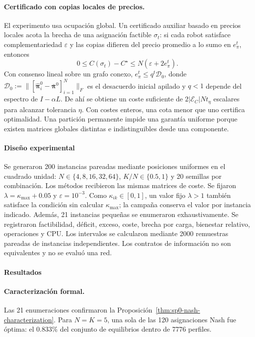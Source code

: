 \paragraph{Certificado con copias locales de precios.}
El experimento usa ocupación global. Un certificado auxiliar basado en precios locales acota la brecha de una asignación factible \(\sigma_t\): si cada robot satisface complementariedad \(\varepsilon\) y las copias difieren del precio promedio a lo sumo en \(e_\pi^t\), entonces
\begin{equation}
 0\leq C(\sigma_t)-C^\star\leq N(\varepsilon+2e_\pi^t).
 \label{eq:sp0-local-price-gap}
\end{equation}
Con consenso lineal sobre un grafo conexo, $e_\pi^t\leq q^t\mathcal D_0$, donde $\mathcal D_0:=\lVert[\widehat{\boldsymbol\pi}_i^0-\bar{\boldsymbol\pi}^0]_{i=1}^N\rVert_F$ es el desacuerdo inicial apilado y $q<1$ depende del espectro de $I-\alpha L$. De ahí se obtiene un coste suficiente de $2|\mathcal E_C|Nt_\eta$ escalares para alcanzar tolerancia $\eta$. Con costes enteros, una cota menor que uno certifica optimalidad. Una partición permanente impide una garantía uniforme porque existen matrices globales distintas e indistinguibles desde una componente.
\fi
\paragraph{Diseño experimental}

Se generaron 200 instancias pareadas mediante posiciones uniformes en el cuadrado unidad: $N\in\{4, 8, 16, 32, 64\}$, $K/N\in\{0.5, 1\}$ y 20 semillas por combinación. Los métodos recibieron las mismas matrices de coste. Se fijaron $\lambda=\kappa_{\max}+0.05$ y $\varepsilon=10^{-3}$. Como $\kappa_{ik}\in[0,1]$, un valor fijo $\lambda>1$ también satisface la condición sin calcular $\kappa_{\max}$; la campaña conserva el valor por instancia indicado. Además, 21 instancias pequeñas se enumeraron exhaustivamente. Se registraron factibilidad, déficit, exceso, coste, brecha por carga, bienestar relativo, operaciones y CPU. Los intervalos se calcularon mediante 2000 remuestras pareadas de instancias independientes. Los contratos de información no son equivalentes y no se evaluó una red.

\paragraph{Resultados}

\paragraph{Caracterización formal.}
Las 21 enumeraciones confirmaron la Proposición~\ref{thm:sp0-nash-characterization}. Para \(N=K=5\), una sola de las 120 asignaciones Nash fue óptima: el \(0.833\%\) del conjunto de equilibrios dentro de 7776 perfiles.


